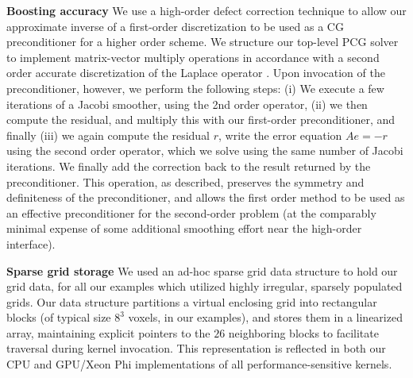 \textbf{Boosting accuracy} We use a high-order defect correction technique \cite{trottenberg:2001:multigrid} to allow our approximate inverse of a first-order
discretization to be used as a CG preconditioner for a higher order scheme. We structure our top-level PCG solver to implement matrix-vector multiply operations in
accordance with a second order accurate discretization of the Laplace operator \cite{Enright:2003:UTP}. Upon invocation of the preconditioner, however, we perform
the following steps: (i) We execute a few iterations of a Jacobi smoother, using the 2nd order operator, (ii) we then compute the residual, and multiply this with
our first-order preconditioner, and finally (iii) we again compute the residual $r$, write the error equation $Ae=-r$ using the second order operator, which we solve
using the same number of Jacobi iterations. We finally add the correction back to the result returned by the preconditioner. This operation, as described, preserves
the symmetry and definiteness of the preconditioner, and allows the first order method to be used as an effective preconditioner for the second-order problem (at the
comparably minimal expense of some additional smoothing effort near the high-order interface).

\textbf{Sparse grid storage}
 We used an ad-hoc sparse grid data structure to hold our grid data, for all
our examples which utilized highly irregular, sparsely populated grids.
 Our data structure partitions a virtual enclosing grid into rectangular blocks (of typical size $8^3$ voxels, in our examples), and stores them in a linearized array,
maintaining explicit pointers to the $26$ neighboring blocks to facilitate traversal during kernel invocation. This representation is reflected in both our CPU and GPU/Xeon Phi
implementations of all performance-sensitive kernels.

